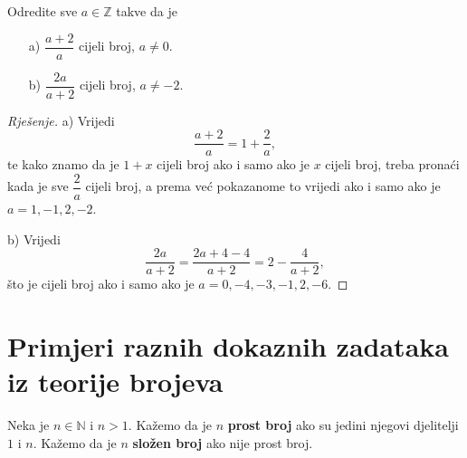 \begin{exercise}
Odredite sve $a\in \mathbb{Z}$ takve da je
\begin{itemize}
\item[a)] $\dfrac{a+2}{a}$ cijeli broj, $a\neq 0$.
\item[b)] $\dfrac{2a}{a+2}$ cijeli broj, $a\neq -2$.
\end{itemize}
\begin{proof}[Rješenje]
a) Vrijedi
$$\dfrac{a+2}{a}=1+\dfrac{2}{a},$$
te kako znamo da je $1+x$ cijeli broj ako i samo ako je $x$ cijeli broj, treba pronaći kada je sve $\dfrac{2}{a}$ cijeli broj, a prema već pokazanome to vrijedi ako i samo ako je $a=1, -1, 2, -2$.

b) Vrijedi
$$\dfrac{2a}{a+2}=\dfrac{2a+4-4}{a+2}=2-\dfrac{4}{a+2},$$
što je cijeli broj ako i samo ako je $a=0, -4, -3, -1, 2, -6$.
\end{proof}
\end{exercise}
\section{Primjeri raznih dokaznih zadataka iz teorije brojeva}

\begin{definition}
Neka je $n\in \mathbb{N}$ i $n>1$. Kažemo da je $n$ \textbf{prost broj} ako su jedini njegovi djelitelji $1$ i $n$. Kažemo da je $n$ \textbf{složen broj} ako nije prost broj.
\end{definition}

